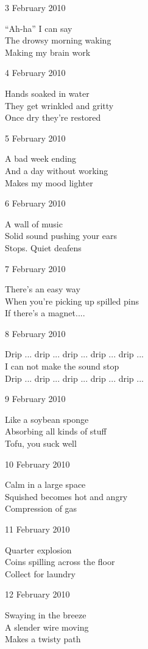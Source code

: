 \documentclass[12pt]{article}
\begin{document}
3 February 2010

``Ah-ha'' I can say \\
The drowsy morning waking \\
Making my brain work

4 February 2010

Hands soaked in water \\
They get wrinkled and gritty \\
Once dry they're restored

5 February 2010

A bad week ending \\
And a day without working \\
Makes my mood lighter

6 February 2010

A wall of music \\
Solid sound pushing your ears \\
Stops. Quiet deafens

7 February 2010

There's an easy way \\
When you're picking up spilled pins \\
If there's a magnet....


\newpage

8 February 2010

Drip ... drip ... drip ... drip ... drip ... \\
I can not make the sound stop \\
Drip ... drip ... drip ... drip ... drip ...

9 February 2010

Like a soybean sponge \\
Absorbing all kinds of stuff \\
Tofu, you suck well

10 February 2010

Calm in a large space \\
Squished becomes hot and angry \\
Compression of gas

11 February 2010

Quarter explosion \\
Coins spilling across the floor \\
Collect for laundry

12 February 2010

Swaying in the breeze \\
A slender wire moving \\
Makes a twisty path
\end{document}
